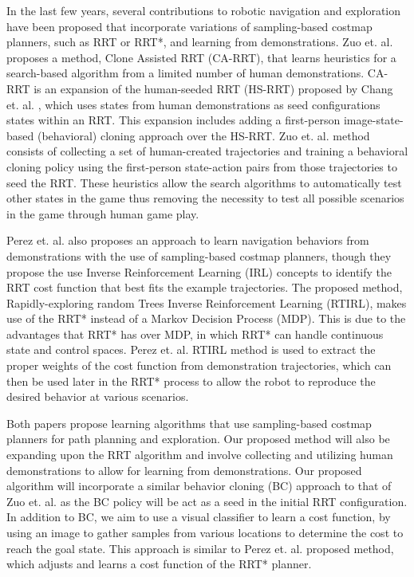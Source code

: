 \documentclass{article}
\begin{document}
In the last few years, several contributions to robotic navigation and exploration have been proposed that incorporate variations of sampling-based costmap planners, such as RRT or RRT*, and learning from demonstrations. Zuo et. al. \cite{Zuo} proposes a method, Clone Assisted RRT (CA-RRT), that learns heuristics for a search-based algorithm from a limited number of human demonstrations. CA-RRT is an expansion of the human-seeded RRT (HS-RRT) proposed by Chang et. al. \cite{Chang}, which uses states from human demonstrations as seed configurations states within an RRT. This expansion includes adding a first-person image-state-based (behavioral) cloning approach over the HS-RRT. Zuo et. al. \cite{Zuo} method consists of collecting a set of human-created trajectories and training a behavioral cloning policy using the first-person state-action pairs from those trajectories to seed the RRT. These heuristics allow the search algorithms to automatically test other states in the game thus removing the necessity to test all possible scenarios in the game through human game play.

Perez et. al. \cite{Perez} also proposes an approach to learn navigation behaviors from demonstrations with the use of sampling-based costmap planners, though they propose the use Inverse Reinforcement Learning (IRL) concepts to identify the RRT cost function that best fits the example trajectories. The proposed method, Rapidly-exploring random Trees Inverse Reinforcement Learning (RTIRL), makes use of the RRT* instead of a Markov Decision Process (MDP). This is due to the advantages that RRT* has over MDP, in which RRT* can handle continuous state and control spaces. Perez et. al. \cite{Perez} RTIRL method is used to extract the proper weights of the cost function from demonstration trajectories, which can then be used later in the RRT* process to allow the robot to reproduce the desired behavior at various scenarios. 

Both papers propose learning algorithms that use sampling-based costmap planners for path planning and exploration. Our proposed method will also be expanding upon the RRT algorithm and involve collecting and utilizing human demonstrations to allow for learning from demonstrations. Our proposed algorithm will incorporate a similar behavior cloning (BC) approach to that of Zuo et. al. \cite{Zuo} as the BC policy will be act as a seed in the initial RRT configuration. In addition to BC, we aim to use a visual classifier to learn a cost function, by using an image to gather samples from various locations to determine the cost to reach the goal state. This approach is similar to Perez et. al. \cite{Perez} proposed method, which adjusts and learns a cost function of the RRT* planner.
\end{document}
